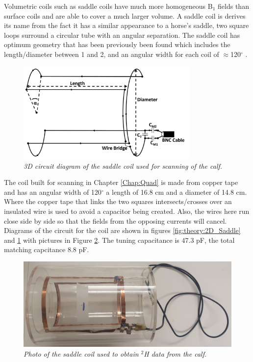 Volumetric coils such as saddle coils have much more homogeneous B$_1$ fields than surface coils and are able to cover a much larger volume. A saddle coil is derives its name from the fact it has a similar appearance to a horse's saddle, two square loops surround a circular tube with an angular separation. The saddle coil has optimum geometry that has been previously been found which includes the length/diameter between 1 and 2, and an angular width for each coil of $\approx$120$^\circ$ \cite{Ginsberg1970OptimumField,Salmon2006OptimizationImaging}.

\begin{figure}
    \centering
    \includegraphics[width=0.8\textwidth]{Figures/Theory/3D_Saddle.png}
    \caption{\textit{3D circuit diagram of the saddle coil used for scanning of the calf.}}
    \label{fig:theory:3D_Saddle}
\end{figure}

The coil built for scanning in Chapter \ref{Chap:Quad} is made from copper tape and has an angular width of 120$^\circ$ a length of 16.8 cm and a diameter of 14.8 cm. Where the copper tape that links the two squares intersects/crosses over an insulated wire is used to avoid a capacitor being created. Also, the wires here run close side by side so that the fields from the opposing currents will cancel. Diagrams of the circuit for the coil are shown in figures \ref{fig:theory:2D_Saddle} and \ref{fig:theory:3D_Saddle} with pictures in Figure \ref{fig:theory:Saddle_pic}. The tuning capacitance is 47.3 pF, the total matching capcitance 8.8 pF.

\begin{figure}
    \centering
    \includegraphics[width=1\textwidth]{Figures/Theory/Saddle_Coil.jpg}
    \caption{\textit{Photo of the saddle coil used to obtain $^2$H data from the calf.}}
    \label{fig:theory:Saddle_pic}
\end{figure}

